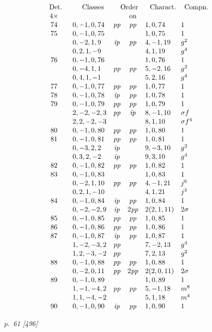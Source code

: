 ﻿\documentclass[11pt,a4paper]{article}
\theoremstyle{plain}
\theoremstyle{definition}
\newcommand{\pp}{\mathit{pp}}
\newcommand{\ip}{\mathit{ip}}
\newcommand{\sg}{\sigma}
\newcommand{\row}[7]{#1 & #2 & #3 & #4 & #5 & #6 & #7\\}
\begin{document}
\[
\renewcommand{\arraystretch}{1.06}
\begin{array}{c@{\quad}r@{\quad}l@{\quad}c@{\quad}c@{\quad}l@{\quad}l}
\multicolumn{1}{c}{\text{Det.}}&&
\multicolumn{1}{c}{\text{Classes}}&
\multicolumn{2}{c}{\text{Order}}&
\multicolumn{1}{c}{\text{Charact.}}&
\multicolumn{1}{c}{\text{Compn.}}\\
4\times&&& &\text{on}&&\\
\row{74}{}{0,-1,0,74}{\pp}{\pp}{1,0,74}{1}
\row{75}{}{0,-1,0,75}{}{}{1,0,75}{1}
\row{}{}{0,-2,1,9}{\ip}{\pp}{4,-1,19}{g^2}
\row{}{}{0,2,1,-9}{}{}{4,1,19}{g^4}
\row{76}{}{0,-1,0,76}{}{}{1,0,76}{1}
\row{}{}{0,-4,1,1}{\pp}{\pp}{5,-2,16}{g^2}
\row{}{}{0,4,1,-1}{}{}{5,2,16}{g^4}
\row{77}{}{0,-1,0,77}{\pp}{\pp}{1,0,77}{1}
\row{78}{}{0,-1,0,78}{\ip}{\pp}{1,0,78}{1}
\row{79}{}{0,-1,0,79}{\pp}{\pp}{1,0,79}{1}
\row{}{}{2,-2,-2,3}{\pp}{\ip}{8,-1,10}{\sg f}
\row{}{}{2,2,-2,-3}{}{}{8,1,10}{\sg f^4}
\row{80}{}{0,-1,0,80}{\pp}{\pp}{1,0,80}{1}
\row{81}{}{0,-1,0,81}{\pp}{\pp}{1,0,81}{1}
\row{}{}{0,-3,2,2}{\ip}{}{9,-3,10}{g^2}
\row{}{}{0,3,2,-2}{\ip}{}{9,3,10}{g^4}
\row{82}{}{0,-1,0,82}{\pp}{\pp}{1,0,82}{1}
\row{83}{}{0,-1,0,83}{}{}{1,0,83}{1}
\row{}{}{0,-2,1,10}{\pp}{\pp}{4,-1,21}{j^6}
\row{}{}{0,2,1,-10}{}{}{4,1,21}{j^3}
\row{84}{}{0,-1,0,84}{\ip}{\pp}{1,0,84}{1}
\row{}{}{0,-2,-2,9}{\ip}{2\pp}{2(2,1,11)}{2\sg}
\row{85}{}{0,-1,0,85}{\pp}{\pp}{1,0,85}{1}
\row{86}{}{0,-1,0,86}{\pp}{\pp}{1,0,86}{1}
\row{87}{}{0,-1,0,87}{\ip}{\pp}{1,0,87}{1}
\row{}{}{1,-2,-3,2}{\pp}{}{7,-2,13}{g^4}
\row{}{}{1,2,-3,-2}{\pp}{}{7,2,13}{g^2}
\row{88}{}{0,-1,0,88}{\pp}{\pp}{1,0,88}{1}
\row{}{}{0,-2,0,11}{\pp}{2\pp}{2(2,0,11)}{2\sg}
\row{89}{}{0,-1,0,89}{}{}{1,0,89}{1}
\row{}{}{1,-1,-4,2}{\pp}{\pp}{5,-1,18}{m^8}
\row{}{}{1,1,-4,-2}{}{}{5,1,18}{m^4}
\row{90}{}{0,-1,0,90}{\ip}{\pp}{1,0,90}{1}
\end{array}
\]

\clearpage
\textit{p.~61 [496]}
\end{document}

